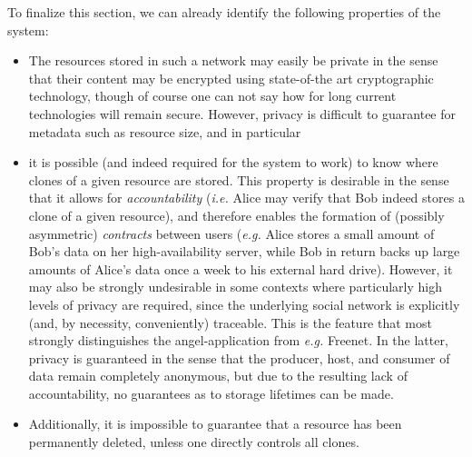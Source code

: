 \documentclass[11pt]{article}
\begin{document}
\begin{mainmatter}
\noindent To finalize this section, we can already identify the following properties of the system:
\begin{itemize}
\item The resources stored in such a network may easily be private in the sense that their content may be encrypted using state-of-the art cryptographic technology, though of course one can not say how for long current technologies will remain secure. However, privacy is difficult to guarantee for metadata such as resource size, and in particular
\item it is possible (and indeed required for the system to work) to know where clones of a given resource are stored. This property is desirable in the sense that it allows for \emph{accountability} (\emph{i.e.} Alice may verify that Bob indeed stores a clone of a given resource), and therefore enables the formation of (possibly asymmetric) \emph{contracts} between users (\emph{e.g.} Alice stores a small amount of Bob's data on her high-availability server, while Bob in return backs up large amounts of Alice's data once a week to his external hard drive). However, it may also be strongly undesirable in some contexts where particularly high levels of privacy are required, since the underlying social network is explicitly (and, by necessity, conveniently) traceable. This is the feature that most strongly distinguishes the angel-application from \emph{e.g.} Freenet. In the latter, privacy is guaranteed in the sense that the producer, host, and consumer of data remain completely anonymous, but due to the resulting lack of accountability, no guarantees as to storage lifetimes can be made. 
\item Additionally, it is impossible to guarantee that a resource has been permanently deleted, unless one directly controls all clones.
\end{itemize} 


\end{mainmatter}
\end{document}
